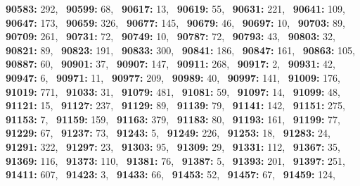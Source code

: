 \textbf{90583:} 292,\allowbreak~ 
\textbf{90599:} 68,\allowbreak~ 
\textbf{90617:} 13,\allowbreak~ 
\textbf{90619:} 55,\allowbreak~ 
\textbf{90631:} 221,\allowbreak~ 
\textbf{90641:} 109,\allowbreak~ 
\textbf{90647:} 173,\allowbreak~ 
\textbf{90659:} 326,\allowbreak~ 
\textbf{90677:} 145,\allowbreak~ 
\textbf{90679:} 46,\allowbreak~ 
\textbf{90697:} 10,\allowbreak~ 
\textbf{90703:} 89,\allowbreak~ 
\textbf{90709:} 261,\allowbreak~ 
\textbf{90731:} 72,\allowbreak~ 
\textbf{90749:} 10,\allowbreak~ 
\textbf{90787:} 72,\allowbreak~ 
\textbf{90793:} 43,\allowbreak~ 
\textbf{90803:} 32,\allowbreak~ 
\textbf{90821:} 89,\allowbreak~ 
\textbf{90823:} 191,\allowbreak~ 
\textbf{90833:} 300,\allowbreak~ 
\textbf{90841:} 186,\allowbreak~ 
\textbf{90847:} 161,\allowbreak~ 
\textbf{90863:} 105,\allowbreak~ 
\textbf{90887:} 60,\allowbreak~ 
\textbf{90901:} 37,\allowbreak~ 
\textbf{90907:} 147,\allowbreak~ 
\textbf{90911:} 268,\allowbreak~ 
\textbf{90917:} 2,\allowbreak~ 
\textbf{90931:} 42,\allowbreak~ 
\textbf{90947:} 6,\allowbreak~ 
\textbf{90971:} 11,\allowbreak~ 
\textbf{90977:} 209,\allowbreak~ 
\textbf{90989:} 40,\allowbreak~ 
\textbf{90997:} 141,\allowbreak~ 
\textbf{91009:} 176,\allowbreak~ 
\textbf{91019:} 771,\allowbreak~ 
\textbf{91033:} 31,\allowbreak~ 
\textbf{91079:} 481,\allowbreak~ 
\textbf{91081:} 59,\allowbreak~ 
\textbf{91097:} 14,\allowbreak~ 
\textbf{91099:} 48,\allowbreak~ 
\textbf{91121:} 15,\allowbreak~ 
\textbf{91127:} 237,\allowbreak~ 
\textbf{91129:} 89,\allowbreak~ 
\textbf{91139:} 79,\allowbreak~ 
\textbf{91141:} 142,\allowbreak~ 
\textbf{91151:} 275,\allowbreak~ 
\textbf{91153:} 7,\allowbreak~ 
\textbf{91159:} 159,\allowbreak~ 
\textbf{91163:} 379,\allowbreak~ 
\textbf{91183:} 80,\allowbreak~ 
\textbf{91193:} 161,\allowbreak~ 
\textbf{91199:} 77,\allowbreak~ 
\textbf{91229:} 67,\allowbreak~ 
\textbf{91237:} 73,\allowbreak~ 
\textbf{91243:} 5,\allowbreak~ 
\textbf{91249:} 226,\allowbreak~ 
\textbf{91253:} 18,\allowbreak~ 
\textbf{91283:} 24,\allowbreak~ 
\textbf{91291:} 322,\allowbreak~ 
\textbf{91297:} 23,\allowbreak~ 
\textbf{91303:} 95,\allowbreak~ 
\textbf{91309:} 29,\allowbreak~ 
\textbf{91331:} 112,\allowbreak~ 
\textbf{91367:} 35,\allowbreak~ 
\textbf{91369:} 116,\allowbreak~ 
\textbf{91373:} 110,\allowbreak~ 
\textbf{91381:} 76,\allowbreak~ 
\textbf{91387:} 5,\allowbreak~ 
\textbf{91393:} 201,\allowbreak~ 
\textbf{91397:} 251,\allowbreak~ 
\textbf{91411:} 607,\allowbreak~ 
\textbf{91423:} 3,\allowbreak~ 
\textbf{91433:} 66,\allowbreak~ 
\textbf{91453:} 52,\allowbreak~ 
\textbf{91457:} 67,\allowbreak~ 
\textbf{91459:} 124,\allowbreak~ 
